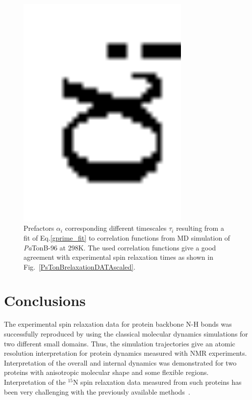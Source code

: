 \documentclass[journal=jpcbfk,manuscript=article]{achemso}
\begin{document}
\begin{figure}[!h]
  \includegraphics[width=8.5cm]{../Figs/coeffsPLOT.eps}%
  \caption{Prefactors $\alpha_i$ corresponding different timescales $\tau_i$
    resulting from a fit of Eq.\ref{gprime_fit} to correlation functions from
    MD simulation of {\it Pa}TonB-96 at 298K. The used correlation functions give
    a good agreement with experimental spin relaxation times as shown in
    Fig.~\ref{PsTonBrelaxationDATAscaled}.  \label{coeffsPLOT}}%
\end{figure}


\section{Conclusions}
The experimental spin relaxation data for protein backbone N-H bonds
was successfully reproduced by using the classical molecular dynamics
simulations for two different small domains.
Thus, the simulation trajectories give an atomic resolution
interpretation for protein dynamics measured with NMR experiments.
Interpretation of the overall and internal dynamics was demonstrated for
two proteins with anisotropic molecular shape and some flexible regions. 
Interpretation of the $^{15}$N spin relaxation data measured from
such proteins has been very challenging with the previously available
methods~\cite{barbato92,luginbuhl97}.
\end{document}
